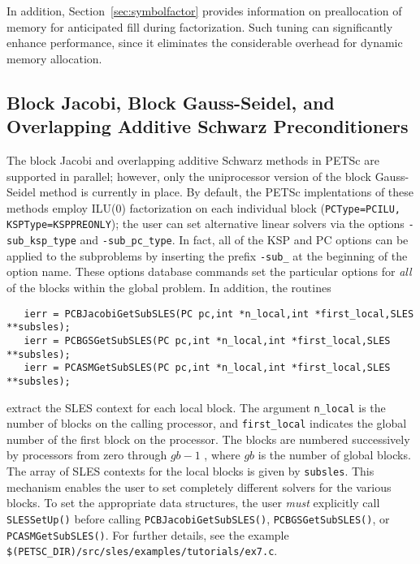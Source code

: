 In addition, Section~\ref{sec:symbolfactor} provides information on
preallocation of memory for anticipated fill during factorization.  
Such tuning can significantly enhance performance, since it
eliminates the considerable overhead for dynamic memory allocation.

\subsection{Block Jacobi, Block Gauss-Seidel, and 
            Overlapping Additive Schwarz Preconditioners}
\label{sec:bjacobi}

 
  
The block Jacobi and overlapping additive Schwarz methods in PETSc are
supported in parallel; however, only the uniprocessor
version of the block Gauss-Seidel method is currently in place.
By default, the PETSc implentations of these methods
employ ILU(0) factorization on each individual block ({\tt PCType=PCILU,
KSPType=KSPPREONLY}); the user can set alternative linear solvers via the options 
 
{\tt -sub\_ksp\_type} and {\tt -sub\_pc\_type}. In fact, all of the KSP
and PC options can be applied to the subproblems by inserting the prefix
{\tt -sub\_} at the beginning of the option name. 
These options database commands set the particular options for {\em all} 
of the blocks within the global problem.  In addition, the routines
\begin{verbatim}
   ierr = PCBJacobiGetSubSLES(PC pc,int *n_local,int *first_local,SLES **subsles);
   ierr = PCBGSGetSubSLES(PC pc,int *n_local,int *first_local,SLES **subsles);
   ierr = PCASMGetSubSLES(PC pc,int *n_local,int *first_local,SLES **subsles);
\end{verbatim}
extract the  SLES context for each local 
block.  The argument {\tt n\_local} is the number of blocks on the 
calling processor, and {\tt first\_local} indicates the global number 
of the first block on the processor. The blocks are numbered 
successively by processors from zero through $ gb-1$ , 
where $ gb $ is the number of global blocks.  
The array of SLES contexts for the local blocks is given by {\tt subsles}. 
This mechanism enables the user to set completely different solvers for the 
various blocks.  To set the appropriate data structures, the 
user {\em must} explicitly call {\tt SLESSetUp()}  
before calling {\tt PCBJacobiGetSubSLES()}, {\tt PCBGSGetSubSLES()}, or
{\tt PCASMGetSubSLES()}.
For further details, see the 
example {\tt \$(PETSC\_DIR)/src/sles/examples/tutorials/ex7.c}.

